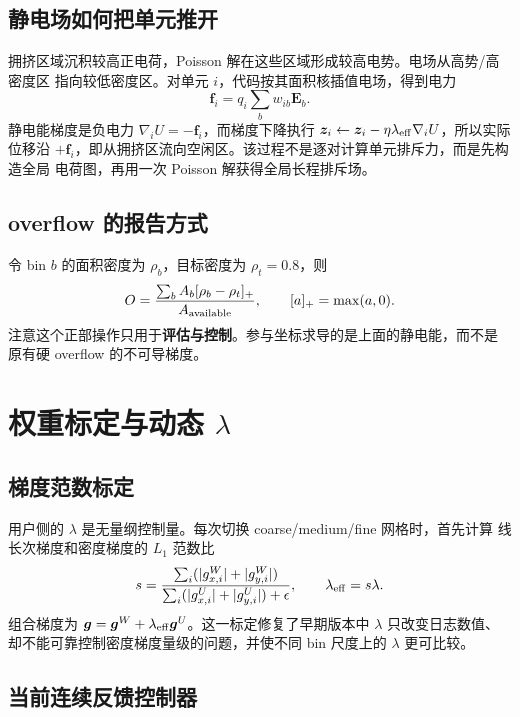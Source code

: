 \documentclass[UTF8,fontset=windows,a4paper,11pt]{ctexart}
\begin{document}
\subsection{静电场如何把单元推开}

拥挤区域沉积较高正电荷，Poisson 解在这些区域形成较高电势。电场从高势/高密度区
指向较低密度区。对单元 $i$，代码按其面积核插值电场，得到电力
\begin{equation}
 \bm f_i=q_i\sum_b w_{ib}\bm E_b.
\end{equation}
静电能梯度是负电力 $\nabla_i U=-\bm f_i$，而梯度下降执行
$\bm z_i\leftarrow\bm z_i-\eta\lambda_{\rm eff}\nabla_iU$，所以实际位移沿
$+\bm f_i$，即从拥挤区流向空闲区。该过程不是逐对计算单元排斥力，而是先构造全局
电荷图，再用一次 Poisson 解获得全局长程排斥场。

\subsection{overflow 的报告方式}

令 bin $b$ 的面积密度为 $\rho_b$，目标密度为 $\rho_t=0.8$，则
\begin{equation}
 O=\frac{\sum_b A_b[\rho_b-\rho_t]_+}{A_{\rm available}},
 \qquad [a]_+=\max(a,0).
\end{equation}
注意这个正部操作只用于\textbf{评估与控制}。参与坐标求导的是上面的静电能，而不是
原有硬 overflow 的不可导梯度。

\section{权重标定与动态 \texorpdfstring{$\lambda$}{lambda}}

\subsection{梯度范数标定}

用户侧的 $\lambda$ 是无量纲控制量。每次切换 coarse/medium/fine 网格时，首先计算
线长次梯度和密度梯度的 $L_1$ 范数比
\begin{equation}
 s=\frac{\sum_i(|g^W_{x,i}|+|g^W_{y,i}|)}
         {\sum_i(|g^U_{x,i}|+|g^U_{y,i}|)+\epsilon},
 \qquad \lambda_{\rm eff}=s\lambda.
\end{equation}
组合梯度为 $\bm g=\bm g^W+\lambda_{\rm eff}\bm g^U$。这一标定修复了早期版本中
$\lambda$ 只改变日志数值、却不能可靠控制密度梯度量级的问题，并使不同 bin 尺度上的
$\lambda$ 更可比较。

\subsection{当前连续反馈控制器}
\end{document}
